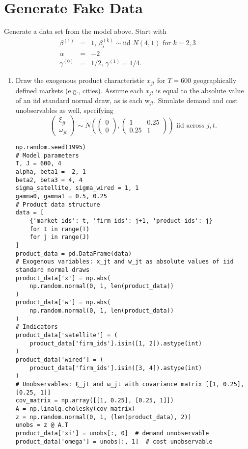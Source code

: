 \documentclass[english,11pt]{article}
\begin{document}
\section{Generate Fake Data}

Generate a data set from the model above. Start with%
\begin{eqnarray*}
\beta ^{(1)} &=&1\text{, }\beta _{i}^{\left( k\right) }\sim \text{iid }%
N\left( 4,1\right) \text{ for }k=2,3 \\
\alpha  &=&-2 \\
\gamma ^{(0)} &=&1/2\text{, }\gamma ^{(1)}=1/4.
\end{eqnarray*}

\begin{enumerate}
\item Draw the exogenous product characteristic $x_{jt}$ for $T=600$
geographically defined markets (e.g., cities). Assume each $x_{jt}$ is equal
to the absolute value of an iid standard normal draw, as is each w$_{jt}$.
Simulate demand and cost unobservables as well, specifying
\begin{equation*}
\left(
\begin{array}{c}
\xi _{jt} \\
\omega _{jt}%
\end{array}%
\right) \sim N\left( \left(
\begin{array}{c}
0 \\
0%
\end{array}%
\right) ,\left(
\begin{array}{cc}
1 & 0.25 \\
0.25 & 1%
\end{array}%
\right) \right) \text{ iid across }j,t.
\end{equation*}


\begin{verbatim}
np.random.seed(1995)
# Model parameters
T, J = 600, 4
alpha, beta1 = -2, 1
beta2, beta3 = 4, 4  
sigma_satellite, sigma_wired = 1, 1
gamma0, gamma1 = 0.5, 0.25
# Product data structure
data = [
    {'market_ids': t, 'firm_ids': j+1, 'product_ids': j} 
    for t in range(T) 
    for j in range(J)
]
product_data = pd.DataFrame(data)
# Exogenous variables: x_jt and w_jt as absolute values of iid standard normal draws
product_data['x'] = np.abs(
    np.random.normal(0, 1, len(product_data))
)
product_data['w'] = np.abs(
    np.random.normal(0, 1, len(product_data))
)
# Indicators
product_data['satellite'] = (
    product_data['firm_ids'].isin([1, 2]).astype(int)
)
product_data['wired'] = (
    product_data['firm_ids'].isin([3, 4]).astype(int)
)
# Unobservables: ξ_jt and ω_jt with covariance matrix [[1, 0.25], [0.25, 1]]
cov_matrix = np.array([[1, 0.25], [0.25, 1]])
A = np.linalg.cholesky(cov_matrix)
z = np.random.normal(0, 1, (len(product_data), 2))
unobs = z @ A.T
product_data['xi'] = unobs[:, 0]  # demand unobservable
product_data['omega'] = unobs[:, 1]  # cost unobservable
\end{verbatim}


\end{enumerate}
\end{document}
